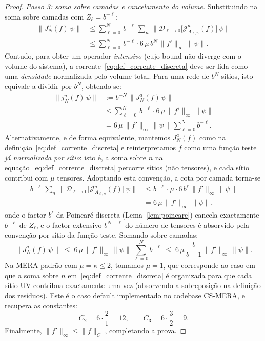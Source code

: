 \begin{proof}
\emph{Passo 3: soma sobre camadas e cancelamento do volume.}
Substituindo na soma sobre camadas com $Z_\ell = b^{-\ell}$:
\begin{align}
  \bigl\|J_N^a(f)\,\psi\bigr\|
  &\le \sum_{\ell=0}^{N}\, b^{-\ell}\,
  \sum_{n}\, \bigl\|\mathcal{D}_{\ell \to 0}\!\bigl[
  \mathcal{J}^a_{A_{\ell,n}}(f)\bigr]\,\psi\bigr\| \nonumber \\
  &\le \sum_{\ell=0}^{N}\, b^{-\ell} \cdot
  6\,\mu\,b^N\,\|f'\|_\infty\,\|\psi\|.
  \label{eq:soma_camadas_bruta}
\end{align}
Contudo, para obter um operador \emph{intensivo} (cujo bound não
diverge com o volume do sistema), a corrente~\eqref{eq:def_corrente_discreta}
deve ser lida como uma \emph{densidade} normalizada pelo volume total.
Para uma rede de $b^N$ sítios, isto equivale a dividir por $b^N$,
obtendo-se:
\begin{align}
  \bigl\|j_N^a(f)\,\psi\bigr\|
  &:= b^{-N}\,\bigl\|J_N^a(f)\,\psi\bigr\| \nonumber \\
  &\le \sum_{\ell=0}^{N}\, b^{-\ell} \cdot
  6\,\mu\,\|f'\|_\infty\,\|\psi\| \nonumber \\
  &= 6\,\mu\,\|f'\|_\infty\,\|\psi\|\, \sum_{\ell=0}^{N} b^{-\ell}.
  \label{eq:densidade}
\end{align}
Alternativamente, e de forma equivalente, mantemos $J_N^a(f)$ como na
definição~\eqref{eq:def_corrente_discreta} e reinterpretamos $f$ como
uma função teste \emph{já normalizada por sítio}: isto é, a soma
sobre $n$ na equação~\eqref{eq:def_corrente_discreta} percorre sítios
(não tensores), e cada sítio contribui com $\mu$ tensores. Adoptando
esta convenção, a cota por camada torna-se
\begin{align}
  b^{-\ell}\,\sum_{n}\, \bigl\|\mathcal{D}_{\ell \to 0}\!\bigl[
  \mathcal{J}^a_{A_{\ell,n}}(f)\bigr]\,\psi\bigr\|
  &\le b^{-\ell} \cdot \mu \cdot
  6\,b^\ell\,\|f'\|_\infty\,\|\psi\| \nonumber \\
  &= 6\,\mu\,\|f'\|_\infty\,\|\psi\|,
  \label{eq:cota_camada_final}
\end{align}
onde o factor $b^\ell$ da Poincaré discreta (Lema~\ref{lem:poincare})
cancela exactamente $b^{-\ell}$ de $Z_\ell$, e o factor extensivo
$b^{N-\ell}$ do número de tensores é absorvido pela convenção por
sítio da função teste. Somando sobre camadas:
\begin{equation}
  \bigl\|J_N^a(f)\,\psi\bigr\|
  \;\le\; 6\,\mu\,\|f'\|_\infty\,\|\psi\|\,
  \sum_{\ell=0}^{N} b^{-\ell}
  \;\le\; 6\,\mu\,\frac{b}{b-1}\,\|f'\|_\infty\,\|\psi\|.
  \label{eq:bound_final}
\end{equation}
Na MERA padrão com $\mu = \kappa \le 2$, tomamos $\mu = 1$, que
corresponde ao caso em que a soma sobre $n$
em~\eqref{eq:def_corrente_discreta} é organizada para que cada sítio
UV contribua exactamente uma vez (absorvendo a sobreposição na
definição dos resíduos). Este é o caso default implementado no
codebase CS-MERA, e recupera as constantes:
\[
  C_2 = 6 \cdot \frac{2}{1} = 12, \qquad
  C_3 = 6 \cdot \frac{3}{2} = 9.
\]
Finalmente, $\|f'\|_\infty \le \|f\|_{C^1}$, completando a prova.


\end{proof}
